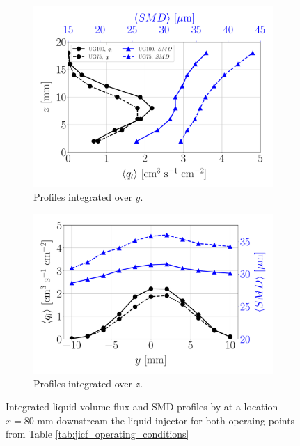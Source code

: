 \begin{figure}[h!]
\flushleft
\begin{subfigure}[b]{0.45\textwidth}
	\flushleft
   \includegraphics[scale=0.275]{./part2_developments/figures_ch6_lagrangian_JICF/expe_results/integrated_fluxes_along_y}
   \caption{Profiles integrated over $y$.}
  \label{fig:integrated_results_Becker_expe_results_over_y} 
\end{subfigure}
\hspace{0.3in}
\begin{subfigure}[b]{0.45\textwidth}
	\centering
   \includegraphics[scale=0.275]{./part2_developments/figures_ch6_lagrangian_JICF/expe_results/integrated_fluxes_along_z}
   \caption{Profiles integrated over $z$.}
  \label{fig:integrated_results_Becker_expe_results_over_z}
\end{subfigure}
\caption[{Integrated liquid volume flux and SMD profiles by  at a location $x = 80$ mm downstream the liquid injector.}]{Integrated liquid volume flux and SMD profiles by  at a location $x = 80$ mm downstream the liquid injector for both operaing points from Table \ref{tab:jicf_operating_conditions}}
\label{fig:integrated_results_Becker_expe_results}
\end{figure}

